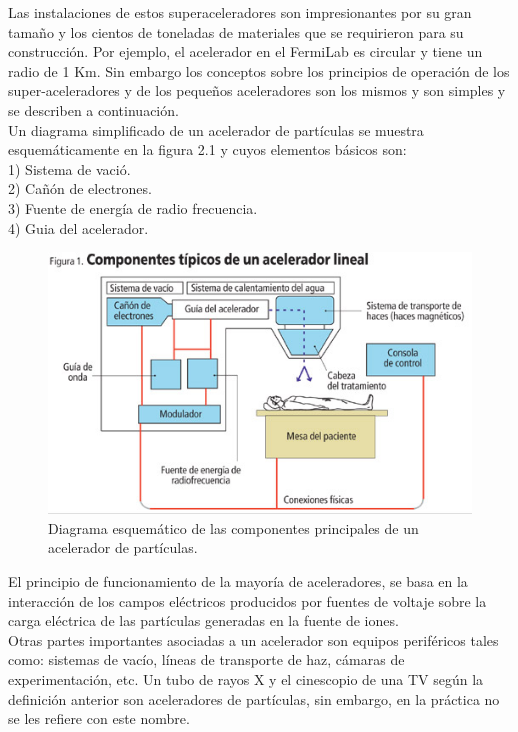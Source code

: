 Las instalaciones de estos superaceleradores son impresionantes por su gran tamaño y los cientos de toneladas de materiales que se requirieron para su construcción. Por ejemplo, el acelerador en el FermiLab es circular y tiene un radio de 1 Km. Sin embargo los conceptos sobre los principios de operación de los super-aceleradores y de los pequeños aceleradores son los mismos y son simples y se describen a continuación.\\

Un diagrama simplificado de un acelerador de partículas se muestra
esquemáticamente en la figura 2.1 y cuyos elementos básicos son:\\
\setlength{\parindent}{0cm}
1) Sistema de vació.\\
2) Cañón de electrones.\\
3) Fuente de energía de radio frecuencia.\\
4) Guia del acelerador.

\begin{figure}[H]
\centering
\includegraphics[width=12cm]{capitulo2/figs/acelerador.png}
\caption{Diagrama esquemático de las componentes principales de un acelerador de
partículas.}
\end{figure}

El principio de funcionamiento de la mayoría de aceleradores, se basa en la
interacción de los campos eléctricos producidos por fuentes de voltaje sobre la
carga eléctrica de las partículas generadas en la fuente de iones.\\

Otras partes importantes asociadas a un acelerador son equipos periféricos
tales como: sistemas de vacío, líneas de transporte de haz, cámaras de
experimentación, etc. 
Un tubo de rayos X y el cinescopio de una TV  según la definición anterior son aceleradores de partículas, sin embargo, en la práctica no se les refiere con este nombre.\\

